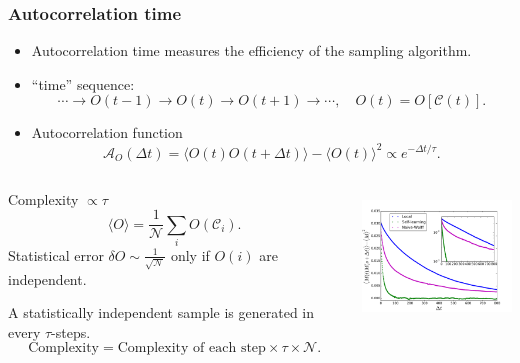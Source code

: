 \documentclass[xcolor=table, 10pt, aspectratio=169, ignorenonframetext]{beamer}
\begin{document}
\begin{frame}
  \frametitle{Autocorrelation time}
  \begin{itemize}
    \item Autocorrelation time measures the efficiency of the sampling algorithm.
    \item ``time'' sequence:
    \[\cdots\rightarrow O(t-1)\rightarrow O(t)\rightarrow O(t+1)\rightarrow\cdots,
  \quad O(t) = O[\mathcal C(t)].\]
    \item Autocorrelation function
    \[\mathcal A_O(\Delta t)=\langle O(t)O(t+\Delta t)\rangle - \langle O(t)\rangle^2\propto e^{-\Delta t/\tau}.\]
  \end{itemize}
  \begin{columns}
    \begin{block}{Complexity $\propto \tau$}
      \[\langle O\rangle = \frac1{\mathcal N}\sum_iO(\mathcal C_i).\]
      Statistical error $\delta O\sim\frac1{\sqrt{\mathcal N}}$ only if $O(i)$ are independent.

A statistically independent sample is generated in every $\tau$-steps.
\[\text{Complexity}=\text{Complexity of each step}\times\tau\times\mathcal N.\]
    \end{block}
    \centering
    \includegraphics[height=3.5cm]{../slmctut/auto_decay}
  \end{columns}
\end{frame}
\end{document}
